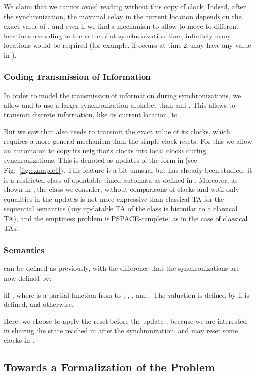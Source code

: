 \documentclass{LMCS}
\theoremstyle{plain}\newtheorem*{prop11}{Proposition~\ref{prop:states} bis}
\begin{document}
We claim that we cannot avoid reading  without this copy of clock. Indeed,
after the synchronization, the maximal delay in the current location depends on
the exact value of , and even if we find a mechanism to allow  to
move to different locations according to the value of  at synchronization
time, infinitely many locations would be required (for example, if  occurs
at time 2,  may have any value in ).

\subsubsection*{Coding Transmission of Information}
In order to model the transmission of information during synchronizations, we
allow  and  to use a larger synchronization alphabet than
 and . This allows  to transmit discrete information,
like its current location, to .

But we saw that  also needs to transmit the exact value of its clocks,
which requires a more general mechanism than the simple clock resets.
For this we allow an automaton to copy its neighbor's clocks into local clocks
during synchronizations. This is denoted as updates of the form  in
 (see Fig.~\ref{fig:example1}).
This feature is a bit unusual but has already been studied: it is a restricted
class of updatable timed automata as defined in \cite{upd}.
Moreover, as shown in \cite{upd}, the class we consider, without comparisons of
clocks and with only equalities in the updates
is not more expressive than classical TA for the sequential semantics
(any updatable TA of the class is bisimilar to a classical TA), and the
emptiness problem is \textsf{PSPACE}-complete, as in the case of classical TAs.

\subsubsection*{Semantics}
 can be defined as previously,
with the difference that the synchronizations are now defined by:

iff ,
 where  is a partial function
from  to , \mbox{},
\mbox{},
and . The valuation  is defined by
 if  is defined, and  otherwise.

Here, we choose to apply the reset  before the update ,
because we are interested in sharing the state reached in  after the
synchronization, and  may reset some clocks in .


\subsection{Towards a Formalization of the Problem}\label{subsec:towards}
\end{document}
